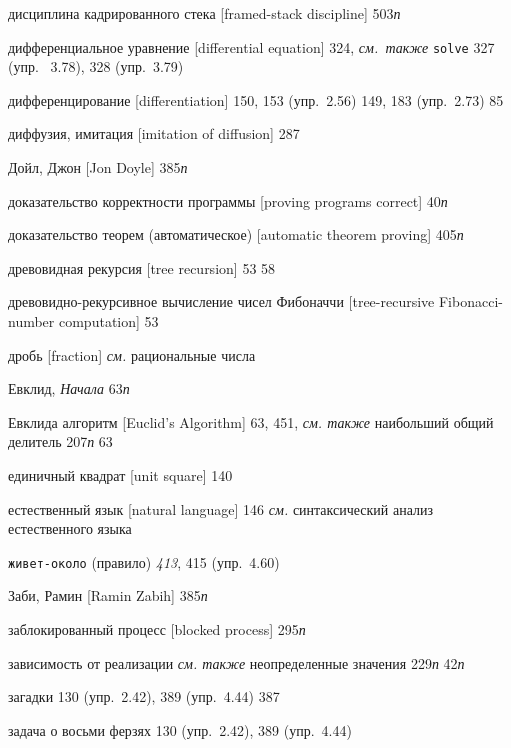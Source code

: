\begin{theindex}
\item {дисциплина кадрированного стека [framed-stack discipline]} 503{\it п}
\item {дифференциальное уравнение [differential equation]} 324, {\it см.~также} \texttt{solve}
   327 (упр.~ 3.78), 328 (упр.~3.79)
\item {дифференцирование [differentiation]}
   150, 153 (упр.~2.56)
   149, 183 (упр.~2.73)
   85
\item {диффузия, имитация [imitation of diffusion]} 287
\item {Дойл, Джон [Jon Doyle]} 385{\it п}
\item {доказательство корректности программы [proving programs correct]} 40{\it п}
\item {доказательство теорем (автоматическое) [automatic theorem proving]} 405{\it п}
\item {древовидная рекурсия [tree recursion]} 53
   58
\item {древовидно-рекурсивное вычисление чисел Фибоначчи [tree-recursive Fi\-bo\-nac\-ci-number computation]} 53
\item {дробь [fraction]} {\it см.} рациональные числа
\bigskip
\item {Евклид, \emph{Начала}} 63{\it п}
\item {Евклида алгоритм [Euclid's Algorithm]} 63, 451, {\it см. также} наибольший общий делитель
   207{\it п}
   63
\item {единичный квадрат [unit square]} 140
\item {естественный язык [natural language]}
   146
   {\it см.} синтаксический анализ естественного языка
\bigskip
\item {\texttt{живет-около} (правило)} {\it 413}, 415 (упр.~4.60)
\bigskip
\item {Заби, Рамин [Ramin Zabih]} 385{\it п}
\item {заблокированный процесс [blocked process]} 295{\it п}
\item {зависимость от реализации} {\it см. также} неопределенные значения
   229{\it п}
   42{\it п}
\item {загадки}
   130 (упр.~2.42), 389 (упр.~4.44)
   387
\item {задача о восьми ферзях} 130 (упр.~2.42), 389 (упр.~4.44)

\end{theindex}

